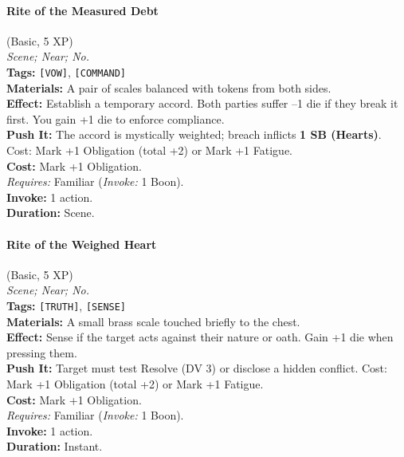 \paragraph{Rite of the Measured Debt} (Basic, 5 XP) \hfill \\
\emph{Scene; Near; No.} \\
\textbf{Tags:} \texttt{[VOW]}, \texttt{[COMMAND]} \\
\textbf{Materials:} A pair of scales balanced with tokens from both sides. \\
\textbf{Effect:} Establish a temporary accord. Both parties suffer --1 die if they break it first. You gain +1 die to enforce compliance. \\
\textbf{Push It:} The accord is mystically weighted; breach inflicts \textbf{1 SB (Hearts)}. Cost: Mark +1 Obligation (total +2) or Mark +1 Fatigue. \\
\textbf{Cost:} Mark +1 Obligation. \\
\textit{Requires:} Familiar (\textit{Invoke:} 1 Boon). \\
\textbf{Invoke:} 1 action. \\
\textbf{Duration:} Scene.

\paragraph{Rite of the Weighed Heart} (Basic, 5 XP) \hfill \\
\emph{Scene; Near; No.} \\
\textbf{Tags:} \texttt{[TRUTH]}, \texttt{[SENSE]} \\
\textbf{Materials:} A small brass scale touched briefly to the chest. \\
\textbf{Effect:} Sense if the target acts against their nature or oath. Gain +1 die when pressing them. \\
\textbf{Push It:} Target must test Resolve (DV 3) or disclose a hidden conflict. Cost: Mark +1 Obligation (total +2) or Mark +1 Fatigue. \\
\textbf{Cost:} Mark +1 Obligation. \\
\textit{Requires:} Familiar (\textit{Invoke:} 1 Boon). \\
\textbf{Invoke:} 1 action. \\
\textbf{Duration:} Instant.

